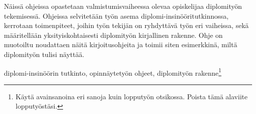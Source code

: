 
\begin{tiivistelma}

Näissä ohjeissa opastetaan valmistumisvaiheessa olevaa opiskelijaa diplomityön tekemisessä. Ohjeissa selvitetään työn asema diplomi-insinööritutkinnossa, kerrotaan toimenpiteet, joihin työn tekijän on ryhdyttävä työn eri vaiheissa, sekä määritellään yksityiskohtaisesti diplomityön kirjallinen rakenne. Ohje on muotoiltu noudattaen näitä kirjoitusohjeita ja toimii siten esimerkkinä, miltä diplomityön tulisi näyttää.

\avainsanat diplomi-insinöörin tutkinto, opinnäytetyön ohjeet, diplomityön
rakenne\footnote{Käytä avainsanoina eri sanoja kuin lopputyön otsikossa. Poista tämä alaviite lopputyöstäsi.}


\end{tiivistelma}

    {}
    {}

